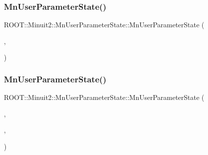 \mbox{\label{classROOT_1_1Minuit2_1_1MnUserParameterState_aafeef85943691c9736a58d6a7830259a}} 
\subsubsection{\texorpdfstring{MnUserParameterState()}{MnUserParameterState()}\hspace{0.1cm}{\footnotesize\ttfamily [22/24]}}
{\footnotesize\ttfamily R\+O\+O\+T\+::\+Minuit2\+::\+Mn\+User\+Parameter\+State\+::\+Mn\+User\+Parameter\+State (\begin{DoxyParamCaption}\item[{const \mbox{\hyperlink{classROOT_1_1Minuit2_1_1MnUserParameters}{Mn\+User\+Parameters}} \&}]{,  }\item[{const \mbox{\hyperlink{classROOT_1_1Minuit2_1_1MnUserCovariance}{Mn\+User\+Covariance}} \&}]{ }\end{DoxyParamCaption})}

\mbox{\label{classROOT_1_1Minuit2_1_1MnUserParameterState_a8214c3f41958849f1aaae4865bb5b129}} 
\subsubsection{\texorpdfstring{MnUserParameterState()}{MnUserParameterState()}\hspace{0.1cm}{\footnotesize\ttfamily [23/24]}}
{\footnotesize\ttfamily R\+O\+O\+T\+::\+Minuit2\+::\+Mn\+User\+Parameter\+State\+::\+Mn\+User\+Parameter\+State (\begin{DoxyParamCaption}\item[{const \mbox{\hyperlink{classROOT_1_1Minuit2_1_1MinimumState}{Minimum\+State}} \&}]{,  }\item[{double}]{,  }\item[{const \mbox{\hyperlink{classROOT_1_1Minuit2_1_1MnUserTransformation}{Mn\+User\+Transformation}} \&}]{ }\end{DoxyParamCaption})}



